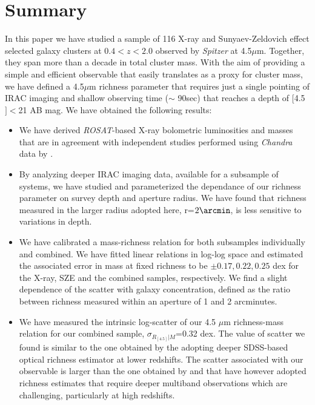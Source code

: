 \documentclass[apj,twocolumn]{emulateapj}
\begin{document}
{\section{Summary}

In this paper we have studied a sample of 116 X-ray and Sunyaev-Zeldovich effect selected galaxy clusters at $0.4 < z < 2.0$ observed by {\it Spitzer} at 4.5$\mu$m. Together, they span more than a decade in total cluster mass. 
With the aim of providing a simple and efficient observable that easily translates as a proxy for cluster mass, we have defined a 4.5$\mu$m richness parameter that requires just a single pointing of IRAC imaging and shallow observing time ($\sim$ 90sec) that reaches a depth of [4.5$]<$21 AB mag. 
We have obtained the following results:

\begin{itemize}
\item{} We have derived {\it ROSAT}-based X-ray bolometric luminosities and masses that are in agreement with independent studies performed using {\it Chandra} data by \citet{Maughan07, Maughan12}.
\end{itemize}

\begin{itemize}
\item{} By analyzing deeper IRAC imaging data, available for a subsample of systems, we have studied and parameterized the dependance of our richness parameter on survey depth and aperture radius. We have  found that richness measured in the larger radius adopted here, r=$2\arcmin$, is less sensitive to variations in depth.
\end{itemize}

\begin{itemize}
\item{} We have calibrated a mass-richness relation for both subsamples individually and combined. We have fitted linear relations in log-log space and estimated the associated error in mass at fixed richness to be $\pm 0.17, 0.22, 0.25$ dex
for the X-ray, SZE and the combined samples, respectively. We find a slight dependence of the scatter with galaxy concentration, defined as the ratio between richness measured within an aperture  of 1 and 2 arcminutes.
\end{itemize}

\begin{itemize}
\item{} 
We have measured the intrinsic log-scatter of our 4.5 $\mu$m richness-mass relation for our combined sample, $\sigma_{R_{[4.5]} | M}$=0.32 dex. The value of scatter we found is similar to the one obtained by the \citet{Planck14} adopting deeper SDSS-based optical richness estimator at lower redshifts. The scatter associated with our observable is larger than the one obtained by  \citet{Andreon15} and \citet{Rozo14b} that have however adopted richness estimates that require deeper  multiband observations which are challenging, particularly at high redshifts.
\end{itemize}

}
\end{document}
